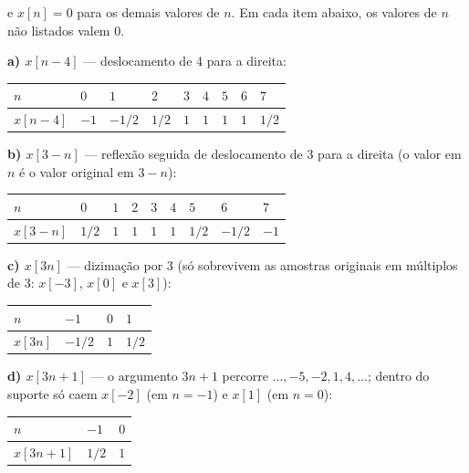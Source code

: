 e \(x[n] = 0\) para os demais valores de \(n\). Em cada item abaixo, os valores de \(n\) não listados valem 0.

\textbf{a) \(x[n - 4]\)} --- deslocamento de 4 para a direita:

\begin{longtable}[]{@{}lllllllll@{}}
\toprule\noalign{}
\(n\) & \(0\) & \(1\) & \(2\) & \(3\) & \(4\) & \(5\) & \(6\) & \(7\) \\
\midrule\noalign{}
\endhead
\bottomrule\noalign{}
\endlastfoot
\(x[n-4]\) & \(-1\) & \(-1/2\) & \(1/2\) & \(1\) & \(1\) & \(1\) & \(1\) & \(1/2\) \\
\end{longtable}

\textbf{b) \(x[3 - n]\)} --- reflexão seguida de deslocamento de 3 para a direita (o valor em \(n\) é o valor original em \(3 - n\)):

\begin{longtable}[]{@{}lllllllll@{}}
\toprule\noalign{}
\(n\) & \(0\) & \(1\) & \(2\) & \(3\) & \(4\) & \(5\) & \(6\) & \(7\) \\
\midrule\noalign{}
\endhead
\bottomrule\noalign{}
\endlastfoot
\(x[3-n]\) & \(1/2\) & \(1\) & \(1\) & \(1\) & \(1\) & \(1/2\) & \(-1/2\) & \(-1\) \\
\end{longtable}

\textbf{c) \(x[3n]\)} --- dizimação por 3 (só sobrevivem as amostras originais em múltiplos de 3: \(x[-3]\), \(x[0]\) e \(x[3]\)):

\begin{longtable}[]{@{}llll@{}}
\toprule\noalign{}
\(n\) & \(-1\) & \(0\) & \(1\) \\
\midrule\noalign{}
\endhead
\bottomrule\noalign{}
\endlastfoot
\(x[3n]\) & \(-1/2\) & \(1\) & \(1/2\) \\
\end{longtable}

\textbf{d) \(x[3n + 1]\)} --- o argumento \(3n + 1\) percorre \(\dots, -5, -2, 1, 4, \dots\); dentro do suporte só caem \(x[-2]\) (em \(n = -1\)) e \(x[1]\) (em \(n = 0\)):

\begin{longtable}[]{@{}lll@{}}
\toprule\noalign{}
\(n\) & \(-1\) & \(0\) \\
\midrule\noalign{}
\endhead
\bottomrule\noalign{}
\endlastfoot
\(x[3n+1]\) & \(1/2\) & \(1\) \\
\end{longtable}

